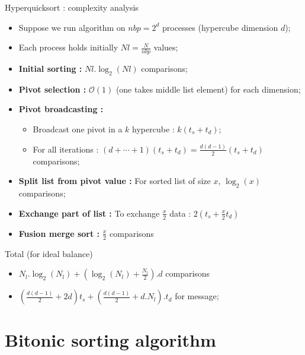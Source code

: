 \documentclass[compress,10pt,aspectratio=169]{beamer}
\begin{document}
\begin{frame}[fragile]{Hyperquicksort : complexity analysis}
    \scriptsize
    \begin{itemize}
        \item Suppose we run algorithm on $nbp=2^{d}$ processes (hypercube dimension $d$);
        \item Each process holds initially $Nl=\frac{N}{nbp}$ values;
        \item \textbf{Initial sorting : } $Nl.\log_{2}(Nl)$ comparisons;
        \item \textbf{Pivot selection : } $\mathcal{O}(1)$ (one takes middle list element) for each dimension;
        \item \textbf{Pivot broadcasting : }
        \begin{itemize}
            \item {\scriptsize Broadcast one pivot in a $k$ hypercube :  $k(t_{s}+t_{d})$;}
            \item {\scriptsize For all iterations : $(d+\cdots+1)(t_{s}+t_{d}) = \frac{d(d-1)}{2}(t_{s}+t_{d})$ comparisons;}
        \end{itemize}
        \item \textbf{Split list from pivot value : } For sorted list of size $x$, $\log_{2}(x)$ comparisons;
        \item \textbf{Exchange part of list : } To exchange $\frac{x}{2}$ data : $2(t_{s}+\frac{x}{2}t_{d})$
        \item \textbf{Fusion merge sort : } $\frac{x}{2}$ comparisons
    \end{itemize}

    \begin{alertblock}{\small Total (for ideal balance)}
        \begin{itemize}
            \item $N_{l}.\log_{2}(N_{l})+\left(\log_{2}(N_{l}) + \frac{N_{l}}{2}\right).d$ comparisons
            \item $\left(\frac{d(d-1)}{2}+2d\right)t_{s} + \left(\frac{d(d-1)}{2}+d.N_{l}\right).t_{d}$ for message;
        \end{itemize}
    \end{alertblock}
\end{frame}

\section{Bitonic sorting algorithm}
\end{document}
